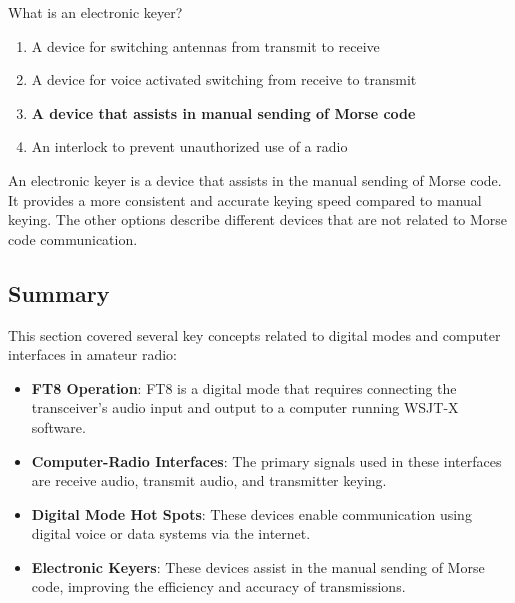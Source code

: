 \begin{tcolorbox}[colback=gray!10!white,colframe=black!75!black,title={T4A12}]
    What is an electronic keyer?
    \begin{enumerate}[label=\Alph*),noitemsep]
        \item A device for switching antennas from transmit to receive
        \item A device for voice activated switching from receive to transmit
        \item \textbf{A device that assists in manual sending of Morse code}
        \item An interlock to prevent unauthorized use of a radio
    \end{enumerate}
\end{tcolorbox}
An electronic keyer is a device that assists in the manual sending of Morse code. It provides a more consistent and accurate keying speed compared to manual keying. The other options describe different devices that are not related to Morse code communication.


\subsection*{Summary}
This section covered several key concepts related to digital modes and computer interfaces in amateur radio:
\begin{itemize}
    \item \textbf{FT8 Operation}: FT8 is a digital mode that requires connecting the transceiver's audio input and output to a computer running WSJT-X software.
    \item \textbf{Computer-Radio Interfaces}: The primary signals used in these interfaces are receive audio, transmit audio, and transmitter keying.
    \item \textbf{Digital Mode Hot Spots}: These devices enable communication using digital voice or data systems via the internet.
    \item \textbf{Electronic Keyers}: These devices assist in the manual sending of Morse code, improving the efficiency and accuracy of transmissions.
\end{itemize}
